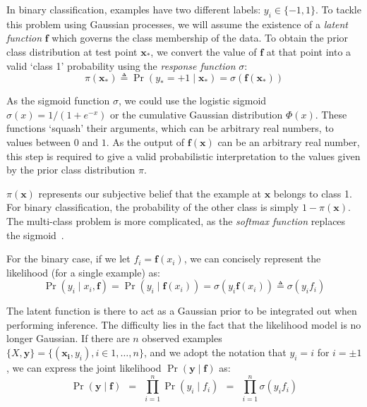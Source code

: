 \documentclass[a4paper,12pt ]{report}
\begin{document}
In binary classification, examples have two different labels: $y_i \in \{ -1, 1 \} $. To tackle this problem using Gaussian processes, we will assume the existence of a \emph{latent function} $\mathbf{f}$ which governs the class membership of the data. To obtain the prior class distribution at test point $\mathbf{x_{*}}$, we convert the value of $\mathbf{f}$ at that point into a valid `{class 1}' probability using the \emph{response function} $\sigma$:
\begin{equation*} \pi(\mathbf{x_{*}}) \triangleq \Pr(y_{*} = +1 \mid \mathbf{x_{*}}) = \sigma(\mathbf{f}(\mathbf{x_{*}})) \end{equation*} %


As the sigmoid function $\sigma$, we could use the logistic sigmoid $\sigma(x) = 1 / (1 + e^{-x})$ or the cumulative Gaussian distribution $\Phi(x)$. These functions `squash' their arguments, which can be arbitrary real numbers, to values between $0$ and $1$. As the output of $\mathbf{f(x)}$ can be an arbitrary real number, this step is required to give a valid probabilistic interpretation to the values given by the prior class distribution $\pi$.

$\pi(\mathbf{x})$ represents our subjective belief that the example at $\mathbf{x}$ belongs to class 1. For binary classification, the probability of the other class is simply $1 - \pi(\mathbf{x})$. The multi-class problem is more complicated, as the \emph{softmax function} replaces the sigmoid~\cite{rasmussen06}.

For the binary case, if we let $f_i = \mathbf{f}(x_i)$, we can concisely represent the likelihood (for a single example) as:
\begin{equation*} \Pr(y_i \mid x_i, \mathbf{f}) = \Pr(y_i \mid \mathbf{f}(x_i) )  = \sigma(y_i \mathbf{f}(x_i)) \triangleq \sigma (y_i f_i) \end{equation*}


The latent function is there to act as a Gaussian prior to be integrated out when performing inference. The difficulty lies in the fact that the likelihood model is no longer Gaussian. If there are $n$ observed examples $\{ X, \mathbf{y} \} = \{ (\mathbf{x_i}, y_i), i \in 1, \ldots, n \} $, and we adopt the notation that $y_{i} = i$ for $i = \pm 1$, we can express the joint likelihood $\Pr(\mathbf{y}\mid\mathbf{f})$ as:
\begin{equation*} \displaystyle  \Pr(\mathbf{y}\mid\mathbf{f}) ~~=~~ \prod_{i = 1}^{n}{\Pr(y_i\mid{f_i})} ~~=~~ \prod_{i=1}^{n}{\sigma(y_i f_i)} \end{equation*}
\end{document}
